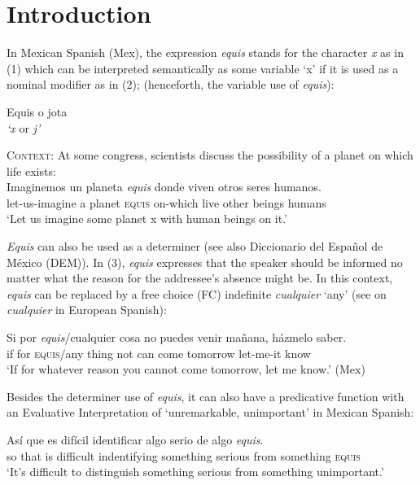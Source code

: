 \documentclass[output=paper]{langsci/langscibook}
\author{Olga Kellert\affiliation{Georg-August-Universität Göttingen}}
\begin{document}
\maketitle
\section{Introduction}\label{sec:kellert:1}
In Mexican Spanish (Mex), the expression \textit{equis} stands for the character \textit{x} as in (1) which can be interpreted semantically as some variable ‘x’ if it is used as a nominal modifier as in (2); (henceforth, the variable use of \textit{equis}):

\ea
Equis o jota\\
\textit{`x} or \textit{j'}
\z

\ea
\textsc{Context}: At some congress, scientists discuss the possibility of a planet on which life exists:\\
\gll Imaginemos un planeta \textit{equis} donde viven otros seres humanos.\\
let-us-imagine a planet \textsc{equis} on-which live other beings humans\\
\glt `Let us imagine some planet x with human beings on it.'
\z

\textit{Equis} can also be used as a determiner (see also Diccionario del Español de México (\nocite{DEM}DEM)). In (3), \textit{equis} expresses that the speaker should be informed no matter what the reason for the addressee’s absence might be. In this context, \textit{equis} can be replaced by a free choice (FC) indefinite \textit{cualquier} ‘any’ (see \citealt{AM2011} on \textit{cualquier} in European Spanish):

\ea
\gll Si por \textit{equis}/cualquier cosa no puedes venir mañana, házmelo saber.\\
if for \textsc{equis}/any thing not can come tomorrow let-me-it know\\
\glt ‘If for whatever reason you cannot come tomorrow, let me know.’ (Mex)
\z

Besides the determiner use of \textit{equis}, it can also have a predicative function with an Evaluative Interpretation of ‘unremarkable, unimportant’ in Mexican Spanish:

\ea
\gll Así que es difícil identificar algo serio de algo \textit{equis}.\\
so that is difficult indentifying something serious from something \textsc{equis}\\
\glt ‘It’s difficult to distinguish something serious from something unimportant.’
\z
\end{document}
